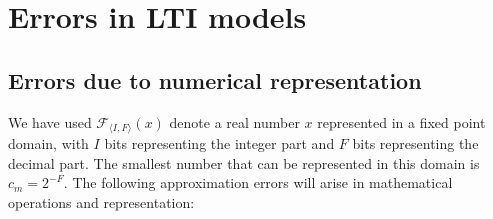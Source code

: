 \documentclass[twocolumn]{autart}    %
\begin{document}
\section{Errors in LTI models} \label{sec:appendix:LTIbackground}

\subsection{Errors due to numerical representation} \label{appendix:numerical_errors}

We have  used $\mathcal{F}_{\langle I,F \rangle}(x)$ denote a real number
$x$ represented in a fixed point domain, with $I$ bits representing the
integer part and $F$ bits representing the decimal part.  The smallest
number that can be represented in this domain is $c_m=2^{-F}$.  The
following approximation errors will arise in mathematical operations and
representation:
%
\end{document}
